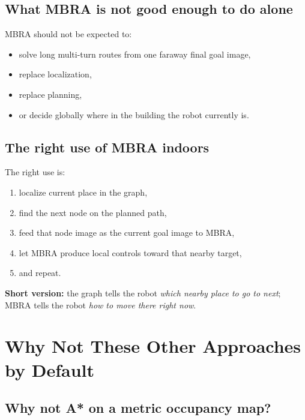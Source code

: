 \documentclass[11pt,a4paper]{article}
\begin{document}
\subsection{What MBRA is not good enough to do alone}

MBRA should not be expected to:
\begin{itemize}[nosep]
  \item solve long multi-turn routes from one faraway final goal image,
  \item replace localization,
  \item replace planning,
  \item or decide globally where in the building the robot currently is.
\end{itemize}

\subsection{The right use of MBRA indoors}

The right use is:
\begin{enumerate}[nosep]
  \item localize current place in the graph,
  \item find the next node on the planned path,
  \item feed that node image as the current goal image to MBRA,
  \item let MBRA produce local controls toward that nearby target,
  \item and repeat.
\end{enumerate}

\begin{mdframed}
\textbf{Short version:} the graph tells the robot \emph{which nearby place to go to next}; MBRA tells the robot \emph{how to move there right now}.
\end{mdframed}


\section{Why Not These Other Approaches by Default}

\subsection{Why not A* on a metric occupancy map?}
\end{document}
